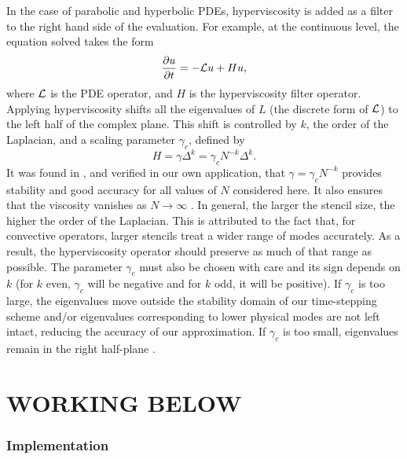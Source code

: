 \documentclass[11pt]{report}
\begin{document}
{In the case of parabolic and hyperbolic PDEs, hyperviscosity is added as a filter to the right hand side of the evaluation. For example, at the continuous level, 
the equation solved takes the form
\begin{equation}
\frac{\partial u}{\partial t} = - \mathcal{L}u + H u,
\label{eq:evaluation_with_hyperviscosity}
\end{equation}
where $\diffop$ is the PDE operator, and $H$ is the hyperviscosity filter operator.
Applying hyperviscosity shifts all the eigenvalues of $L$ (the discrete form of $\mathcal{L}$) to the left half of the complex plane. 
This shift is controlled by $k$, the order of the Laplacian, and a scaling parameter $\gamma_c$, defined by
\begin{equation*}	
H = \gamma \Delta^{k} = \gamma_c N^{-k} \Delta^{k}.
\end{equation*}
It was found in \cite{FlyerLehto11}, and verified in our own application, that $\gamma = \gamma_c N^{-k}$  provides stability and good accuracy for all values of $N$ considered here. It also ensures that the viscosity vanishes as $N\rightarrow\infty$ \cite{FlyerLehto11}.
In general, the larger the stencil size, the higher the order of the Laplacian.  This is attributed to the fact that, for convective operators, larger stencils treat a wider range of modes accurately. As a result, the hyperviscosity operator should preserve as much of that range as possible. The parameter $\gamma_c$ must also be chosen with care and its sign depends on $k$ (for $k$ even, $\gamma_c$ will be negative and for $k$ odd, it will be positive). If $\gamma_c$ is too large, the eigenvalues move outside the stability domain of our time-stepping scheme and/or eigenvalues corresponding to lower physical modes are not left intact, reducing the accuracy of our approximation. If $\gamma_c$ is too small, eigenvalues remain in the right half-plane \cite{FornbergLehto11,FlyerLehto11}.




\part{WORKING BELOW}

\section{Implementation}

}
\end{document}

